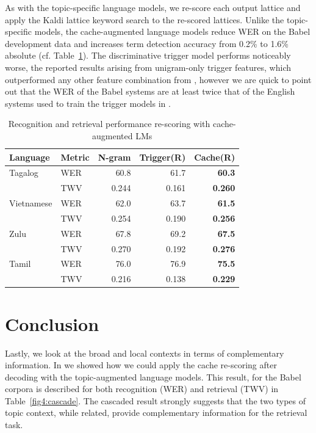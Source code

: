As with the topic-specific language models, we re-score each output lattice and apply the Kaldi lattice keyword search to the re-scored lattices.  Unlike the topic-specific models, the cache-augmented language models reduce WER on the Babel development data and increases term detection accuracy from 0.2\% to 1.6\% absolute (cf. Table~\ref{fig4:cachelms}).  The discriminative trigger model performs noticeably worse, the reported results arising from unigram-only trigger features, which outperformed any other feature combination from \cite{singh2007trigger}, however we are quick to point out that the WER of the Babel systems are at least twice that of the English systems used to train the trigger models in \cite{singh2007trigger}.

\begin{table}
\centering
   \begin{tabular}{l|l|rrr} \toprule
   \bf Language & \bf Metric & \bf N-gram & \bf Trigger(R) & \bf Cache(R) \\ \midrule
Tagalog& WER & 60.8 & 61.7 & \textbf{60.3} \\
        & TWV & 0.244 & 0.161 & \textbf{0.260} \\ \midrule
Vietnamese &   WER & 62.0 & 63.7 & \textbf{61.5}  \\
        & TWV & 0.254 & 0.190 & \textbf{0.256} \\ \midrule
Zulu&   WER & 67.8 & 69.2 & \textbf{67.5} \\
        & TWV & 0.270 & 0.192 & \textbf{0.276} \\ \midrule
Tamil&   WER & 76.0 & 76.9 &  \textbf{75.5}  \\
        & TWV & 0.216 & 0.138 &\textbf{0.229} \\ \bottomrule
        \end{tabular}
\caption[Re-scoring with cache-augmented LMs]{Recognition and retrieval performance re-scoring with cache-augmented LMs  \label{fig4:cachelms}}
\end{table}

\section{Conclusion}

Lastly, we look at the broad and local contexts in terms of complementary information.  In \cite{wintrode2014slta} we showed how we could apply the cache re-scoring after decoding with the topic-augmented language models.  This result, for the Babel corpora is described for both recognition  (WER) and retrieval (TWV) in Table~\ref{fig4:cascade}.  The cascaded result strongly suggests that the two types of topic context, while related, provide complementary information for the retrieval task.

